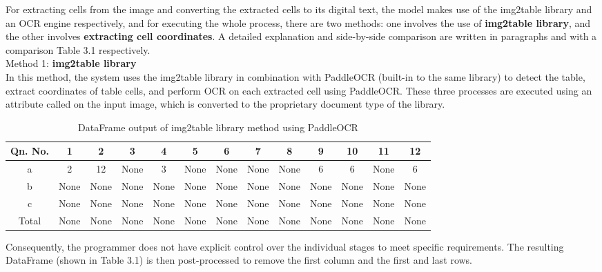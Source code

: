 \noindent For extracting cells from the image and converting the extracted cells to its digital text, the model makes use of the img2table library and an OCR engine respectively, and for executing the whole process, there are two methods: one involves the use of \textbf{img2table library}, and the other involves \textbf{extracting cell coordinates}. A detailed explanation and side-by-side comparison are written in paragraphs and with a comparison Table 3.1 respectively.\\

\noindent Method 1: \textbf{img2table library}\\

\noindent In this method, the system uses the img2table library in combination with PaddleOCR (built-in to the same library) to detect the table, extract coordinates of table cells, and perform OCR on each extracted cell using PaddleOCR. These three processes are executed using an attribute called on the input image, which is converted to the proprietary document type of the library.\\



\begin{table}[ht]
  \centering
  \footnotesize
  \begin{tabular}{|c|c|c|c|c|c|c|c|c|c|c|c|c|}
  \hline
  Qn. No. & 1 & 2 & 3 & 4 & 5 & 6 & 7 & 8 & 9 & 10 & 11 & 12 \\
  \hline
  a & 2 & 12 & None & 3 & None & None & None & None & 6 & 6 & None & 6 \\
  \hline
  b & None & None & None & None & None & None & None & None & None & None & None & None \\
  \hline
  c & None & None & None & None & None & None & None & None & None & None & None & None \\
  \hline
  Total & None & None & None & None & None & None & None & None & None & None & None & None \\
  \hline
  \end{tabular}
  \caption{DataFrame output of img2table library method using PaddleOCR}
\end{table}


\noindent  Consequently, the programmer does not have explicit control over the individual stages to meet specific requirements. The resulting DataFrame (shown in Table 3.1) is then post-processed to remove the first column and the first and last rows.\\

